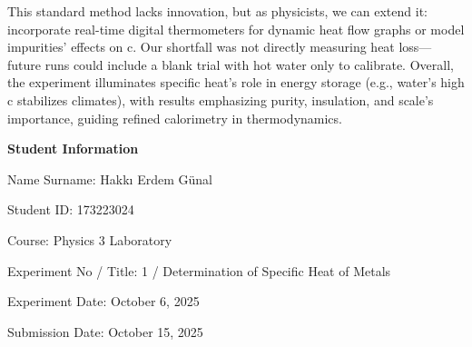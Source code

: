 \documentclass[12pt, a4paper]{article}
\begin{document}
This standard method lacks innovation, but as physicists, we can extend it: incorporate real-time digital thermometers for dynamic heat flow graphs or model impurities' effects on c. Our shortfall was not directly measuring heat loss---future runs could include a blank trial with hot water only to calibrate. Overall, the experiment illuminates specific heat's role in energy storage (e.g., water's high c stabilizes climates), with results emphasizing purity, insulation, and scale's importance, guiding refined calorimetry in thermodynamics.

\newpage

\textbf{Student Information}

Name Surname: Hakkı Erdem Günal

Student ID: 173223024

Course: Physics 3 Laboratory

Experiment No / Title: 1 / Determination of Specific Heat of Metals

Experiment Date: October 6, 2025

Submission Date: October 15, 2025
\end{document}
